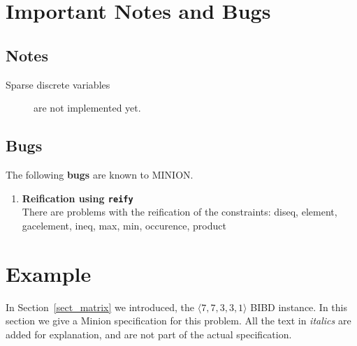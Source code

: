 \documentclass{article}
\begin{document}
\begin{small}
\section{Important Notes and Bugs}\label{sect_notes}

\subsection*{Notes}

\begin{description}
  \item[Sparse discrete variables] are not implemented yet. 
\end{description}

\subsection*{Bugs}
The following \textbf{bugs} are known to {\sc MINION}.
\begin{enumerate}


\item \textbf{Reification using \texttt{reify}} \\
 There are problems with the reification of the constraints: 
diseq, element, gacelement, ineq, max, min, occurence, product

\end{enumerate}




\section{Example}\label{sect_example}

In Section~\ref{sect_matrix} we introduced, the $\langle 7, 7, 3, 3,
1\rangle$ BIBD instance. In this section we give a Minion specification
for this problem. All the text in \emph{italics} are added for
explanation, and are not part of the actual specification.


\end{small}
\end{document}
